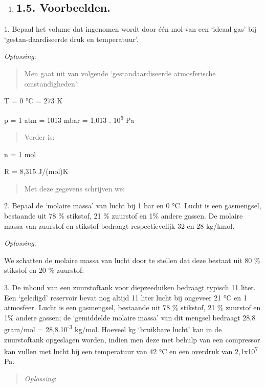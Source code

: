 \documentclass[]{article}
\begin{document}
\begin{enumerate}
\item
  \subsection{1.5. Voorbeelden.}\label{voorbeelden.}
\end{enumerate}

1. Bepaal het volume dat ingenomen wordt door één mol van een `ideaal
gas' bij `gestan-daardiseerde druk en temperatuur'.

\emph{Oplossing}:

\begin{quote}
Men gaat uit van volgende `gestandaardiseerde atmosferische
omstandigheden':
\end{quote}

T = 0 °C = 273 K

p = 1 atm = 1013 mbar = 1,013 . 10\textsuperscript{5} Pa

\begin{quote}
Verder is:
\end{quote}

n = 1 mol

R = 8,315 J/(mol)K

\begin{quote}
Met deze gegevens schrijven we:
\end{quote}

2. Bepaal de `molaire massa' van lucht bij 1 bar en 0 °C. Lucht is een
gasmengsel, bestaande uit 78 \% stikstof, 21 \% zuurstof en 1\% andere
gassen. De molaire massa van zuurstof en stikstof bedraagt
respectievelijk 32 en 28 kg/kmol.

\emph{Oplossing}:

We schatten de molaire massa van lucht door te stellen dat deze bestaat
uit 80 \% stikstof en 20 \% zuurstof:

3. De inhoud van een zuurstoftank voor diepzeeduiken bedraagt typisch 11
liter. Een `geledigd' reservoir bevat nog altijd 11 liter lucht bij
ongeveer 21 °C en 1 atmosfeer. Lucht is een gasmengsel, bestaande uit 78
\% stikstof, 21 \% zuurstof en 1\% andere gassen; de `gemiddelde molaire
massa' van dit mengsel bedraagt 28,8 gram/mol =
28,8.10\textsuperscript{-3} kg/mol. Hoeveel kg `bruikbare lucht' kan in
de zuurstoftank opgeslagen worden, indien men deze met behulp van een
compressor kan vullen met lucht bij een temperatuur van 42 °C en een
overdruk van 2,1x10\textsuperscript{7} Pa.

\begin{quote}
\emph{Oplossing}:
\end{quote}
\end{document}
